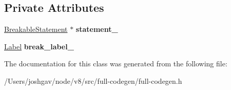 \subsection*{Private Attributes}
\begin{DoxyCompactItemize}
\item 
\hyperlink{classv8_1_1internal_1_1_breakable_statement}{Breakable\+Statement} $\ast$ {\bfseries statement\+\_\+}\hypertarget{classv8_1_1internal_1_1_full_code_generator_1_1_breakable_a48463bb86f46f4c8218d5e49239aa367}{}\label{classv8_1_1internal_1_1_full_code_generator_1_1_breakable_a48463bb86f46f4c8218d5e49239aa367}

\item 
\hyperlink{classv8_1_1internal_1_1_label}{Label} {\bfseries break\+\_\+label\+\_\+}\hypertarget{classv8_1_1internal_1_1_full_code_generator_1_1_breakable_ae164a93306ed705c356849a21f9bd4aa}{}\label{classv8_1_1internal_1_1_full_code_generator_1_1_breakable_ae164a93306ed705c356849a21f9bd4aa}

\end{DoxyCompactItemize}


The documentation for this class was generated from the following file\+:\begin{DoxyCompactItemize}
\item 
/\+Users/joshgav/node/v8/src/full-\/codegen/full-\/codegen.\+h\end{DoxyCompactItemize}
